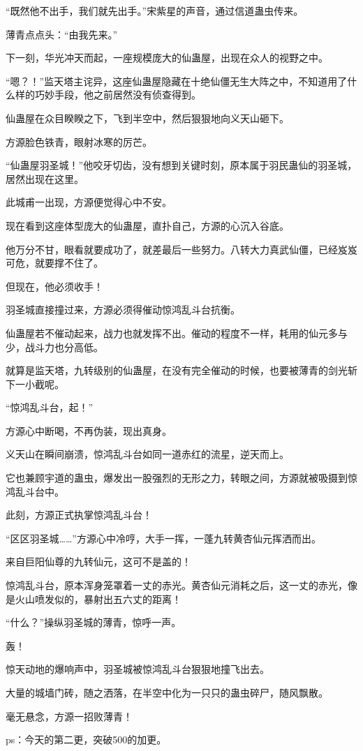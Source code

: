 \begin{this_body}
“既然他不出手，我们就先出手。”宋紫星的声音，通过信道蛊虫传来。

薄青点点头：“由我先来。”

下一刻，华光冲天而起，一座规模庞大的仙蛊屋，出现在众人的视野之中。

“嗯？！”监天塔主诧异，这座仙蛊屋隐藏在十绝仙僵无生大阵之中，不知道用了什么样的巧妙手段，他之前居然没有侦查得到。

仙蛊屋在众目睽睽之下，飞到半空中，然后狠狠地向义天山砸下。

方源脸色铁青，眼射冰寒的厉芒。

“仙蛊屋羽圣城！”他咬牙切齿，没有想到关键时刻，原本属于羽民蛊仙的羽圣城，居然出现在这里。

此城甫一出现，方源便觉得心中不安。

现在看到这座体型庞大的仙蛊屋，直扑自己，方源的心沉入谷底。

他万分不甘，眼看就要成功了，就差最后一些努力。八转大力真武仙僵，已经岌岌可危，就要撑不住了。

但现在，他必须收手！

羽圣城直接撞过来，方源必须得催动惊鸿乱斗台抗衡。

仙蛊屋若不催动起来，战力也就发挥不出。催动的程度不一样，耗用的仙元多与少，战斗力也分高低。

就算是监天塔，九转级别的仙蛊屋，在没有完全催动的时候，也要被薄青的剑光斩下一小截呢。

“惊鸿乱斗台，起！”

方源心中断喝，不再伪装，现出真身。

义天山在瞬间崩溃，惊鸿乱斗台如同一道赤红的流星，逆天而上。

它也兼顾宇道的蛊虫，爆发出一股强烈的无形之力，转眼之间，方源就被吸摄到惊鸿乱斗台中。

此刻，方源正式执掌惊鸿乱斗台！

“区区羽圣城……”方源心中冷哼，大手一挥，一蓬九转黄杏仙元挥洒而出。

来自巨阳仙尊的九转仙元，这可不是盖的！

惊鸿乱斗台，原本浑身笼罩着一丈的赤光。黄杏仙元消耗之后，这一丈的赤光，像是火山喷发似的，暴射出五六丈的距离！

“什么？”操纵羽圣城的薄青，惊呼一声。

轰！

惊天动地的爆响声中，羽圣城被惊鸿乱斗台狠狠地撞飞出去。

大量的城墙门砖，随之洒落，在半空中化为一只只的蛊虫碎尸，随风飘散。

毫无悬念，方源一招败薄青！

ps：今天的第二更，突破500的加更。

\end{this_body}

